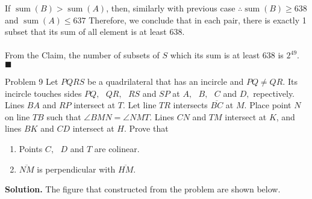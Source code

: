 \documentclass[12pt]{article}
\begin{document}
If $\operatorname{sum}(B) > \operatorname{sum}(A)$, then, similarly with previous case  $\therefore \operatorname{sum}(B) \geq 638$ and $\operatorname{sum}(A) \leq 637$
Therefore, we conclude that in each pair, there is exactly 1 subset that its sum of all element is at least 638. \\ \\
From the Claim, the number of subsets of $S$ which its sum is at least $638$ is $2^{49}$.  \null\hfill $\blacksquare$
\newpage
\begin{mybox}{Problem 9}
 Let $PQRS$ be a quadrilateral that has an incircle and $PQ\neq QR$. Its incircle touches sides $PQ,\text{ } QR,\text{ }  RS$ and $SP$ at $A,\text{ } B,\text{ }  C$ and $D,$ repectively. Lines $BA$ and $RP$ intersect at $T$. Let line $TR$ intersects $\overline{BC}$ at $M$. Place point $N$ on line $TB$ such that $\angle{BMN} = \angle{NMT}$. Lines  $CN$ and  $TM$ intersect at $K$, and lines $BK$ and $CD$ intersect at $H$. Prove that 
\begin{enumerate}[label=(\alph*)]
\item Points $C,\text{ } D$ and $T$ are colinear.
\item $\overline{NM}$ is perpendicular with $\overline{HM}$.
\end{enumerate} 
\end{mybox}
\textbf{Solution.} The figure that constructed from the problem are shown below.\\
\end{document}
